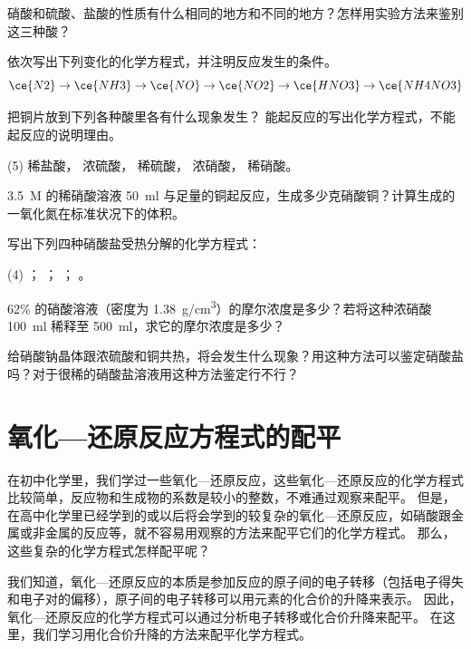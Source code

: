 \begin{Practice}[习题]
\begin{question}
  \item 硝酸和硫酸、盐酸的性质有什么相同的地方和不同的地方？怎样用实验方法来鉴别这三种酸？
  \item 依次写出下列变化的化学方程式，并注明反应发生的条件。
  \[\ce{N2}\to\ce{NH3}\to\ce{NO}\to\ce{NO2}\to\ce{HNO3}\to\ce{NH4NO3}\]
  \item 把铜片放到下列各种酸里各有什么现象发生？ 能起反应的写出化学方程式，不能起反应的说明理由。
  \begin{tasks}(5)
    \task 稀盐酸，
    \task 浓硫酸，
    \task 稀硫酸，
    \task 浓硝酸，
    \task 稀硝酸。
  \end{tasks}
  \item \qty{3.5}{M} 的稀硝酸溶液 \qty{50}{ml} 与足量的铜起反应，生成多少克硝酸铜？计算生成的一氧化氮在标准状况下的体积。
  \item 写出下列四种硝酸盐受热分解的化学方程式：
  \begin{tasks}(4)
    \task {}；
    \task {}；
    \task {}；
    \task {}。
  \end{tasks}
  \item 62\% 的硝酸溶液（密度为 \qty{1.38}{g/cm^3}）的摩尔浓度是多少？若将这种浓硝酸 \qty{100}{ml} 稀释至 \qty{500}{ml}，求它的摩尔浓度是多少？
  \item 给硝酸钠晶体跟浓硫酸和铜共热，将会发生什么现象？用这种方法可以鉴定硝酸盐吗？对于很稀的硝酸盐溶液用这种方法鉴定行不行？
\end{question}
\end{Practice}

\section{氧化—还原反应方程式的配平}
在初中化学里，我们学过一些氧化—还原反应，这些氧化—还原反应的化学方程式比较简单，反应物和生成物的系数是较小的整数，不难通过观察来配平。
但是，在高中化学里已经学到的或以后将会学到的较复杂的氧化—还原反应，如硝酸跟金属或非金属的反应等，就不容易用观察的方法来配平它们的化学方程式。
那么，这些复杂的化学方程式怎样配平呢？

我们知道，氧化—还原反应的本质是参加反应的原子间的电子转移（包括电子得失和电子对的偏移），原子间的电子转移可以用元素的化合价的升降来表示。
因此，氧化—还原反应的化学方程式可以通过分析电子转移或化合价升降来配平。
在这里，我们学习用化合价升降的方法来配平化学方程式。

